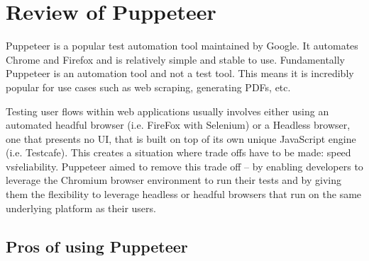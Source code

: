 \documentclass[12pt,a4paper,titlepage]{report}
\begin{document}
\section{Review of Puppeteer}

Puppeteer is a popular test automation tool maintained by Google. It automates Chrome and Firefox and is relatively simple and stable to use.
Fundamentally Puppeteer is an automation tool and not a test tool.
This means it is incredibly popular for use cases such as web scraping, generating PDFs, etc.

Testing user flows within web applications usually involves either using an automated headful
browser (i.e. FireFox with Selenium) or a Headless browser, one that presents no UI, that is built on top of its own unique JavaScript
engine (i.e. Testcafe). This creates a situation where trade offs have to be made: speed vs\. reliability.
Puppeteer aimed to remove this trade off – by enabling developers to leverage the Chromium browser environment
to run their tests and by giving them the flexibility to leverage headless or headful browsers that run on the same underlying platform as their users.

\subsection{Pros of using Puppeteer}
\end{document}
